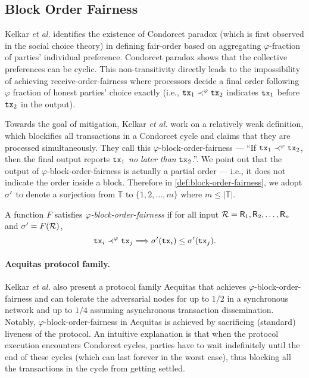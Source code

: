 \subsection{Block Order Fairness}

Kelkar \textit{et al.} \cite{C:KZGJ20} identifies the existence of Condorcet paradox (which is first observed in the social choice theory) in defining fair-order based on aggregating $\varphi$-fraction of parties' individual preference.
%
Condorcet paradox shows that the collective preferences can be cyclic.
%
This non-transitivity directly leads to the impossibility of achieving receive-order-fairness where processors decide a final order following $\varphi$ fraction of honest parties' choice exactly (i.e., $\mathtt{tx}_1 \prec^\varphi \mathtt{tx}_2$ indicates $\mathtt{tx}_1$ before $\mathtt{tx}_2$ in the output).

Towards the goal of mitigation, Kelkar \textit{et al.} work on a relatively weak definition, which blockifies all transactions in a Condorcet cycle and claims that they are processed simultaneously.
%
They call this $\varphi$-block-order-fairness --- ``If $\mathtt{tx}_1 \prec^\varphi \mathtt{tx}_2$, then the final output reports $\mathtt{tx}_1$ \emph{no later than} $\mathtt{tx}_2$.''.
%
We point out that the output of $\varphi$-block-order-fairness is actually a partial order --- i.e., it does not indicate the order inside a block.
%
Therefore in \cref{def:block-order-fairness}, we adopt $\sigma'$ to denote a surjection from $\mathbb{T}$ to $\{1, 2, \ldots, m\}$ where $m \le |\mathbb{T}|$.

\begin{definition}
    \label{def:block-order-fairness}
    
    A function $F$ satisfies \emph{$\varphi$-block-order-fairness} if for all input $\mathcal{R} = \mathsf{R}_1, \mathsf{R}_2, \ldots, \mathsf{R}_n$ and $\sigma' = F(\mathcal{R})$,
    \[
        \mathtt{tx}_i \prec^\varphi \mathtt{tx}_j \Longrightarrow \sigma'(\mathtt{tx}_i) \le \sigma'(\mathtt{tx}_j).
    \]
\end{definition}

\paragraph{\textsf{Aequitas} protocol family.}
%
Kelkar \textit{et al.} \cite{C:KZGJ20} also present a protocol family \textsf{Aequitas} that achieves $\varphi$-block-order-fairness and can tolerate the adversarial nodes for up to $1 / 2$ in a synchronous network and up to $1 / 4$ assuming asynchronous transaction dissemination.
%
Notably, $\varphi$-block-order-fairness in \textsf{Aequitas} is achieved by sacrificing (standard) liveness of the protocol.
%
An intuitive explanation is that when the protocol execution encounters Condorcet cycles, parties have to wait indefinitely until the end of these cycles (which can last forever in the worst case), thus blocking all the transactions in the cycle from getting settled.

